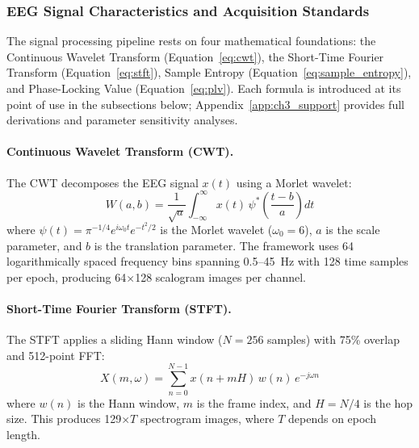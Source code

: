\subsubsection{EEG Signal Characteristics and Acquisition Standards}
\label{app_sec:eeg_data_attributes}


The signal processing pipeline rests on four mathematical foundations: the Continuous Wavelet Transform (Equation~\ref{eq:cwt}), the Short-Time Fourier Transform (Equation~\ref{eq:stft}), Sample Entropy (Equation~\ref{eq:sample_entropy}), and Phase-Locking Value (Equation~\ref{eq:plv}). Each formula is introduced at its point of use in the subsections below; Appendix~\ref{app:ch3_support} provides full derivations and parameter sensitivity analyses.

\paragraph{Continuous Wavelet Transform (CWT).}
The CWT decomposes the EEG signal $x(t)$ using a Morlet wavelet:
\begin{equation}
W(a,b) = \frac{1}{\sqrt{a}} \int_{-\infty}^{\infty} x(t) \, \psi^{*}\!\left(\frac{t-b}{a}\right) dt
\label{app_eq:cwt}
\end{equation}
where $\psi(t) = \pi^{-1/4} e^{i\omega_0 t} e^{-t^2/2}$ is the Morlet wavelet ($\omega_0 = 6$), $a$ is the scale parameter, and $b$ is the translation parameter. The framework uses 64 logarithmically spaced frequency bins spanning 0.5--45~Hz with 128 time samples per epoch, producing 64$\times$128 scalogram images per channel.

\paragraph{Short-Time Fourier Transform (STFT).}
The STFT applies a sliding Hann window ($N = 256$ samples) with 75\% overlap and 512-point FFT:
\begin{equation}
X(m, \omega) = \sum_{n=0}^{N-1} x(n + mH) \, w(n) \, e^{-j\omega n}
\label{app_eq:stft}
\end{equation}
where $w(n)$ is the Hann window, $m$ is the frame index, and $H = N/4$ is the hop size. This produces 129$\times T$ spectrogram images, where $T$ depends on epoch length.

